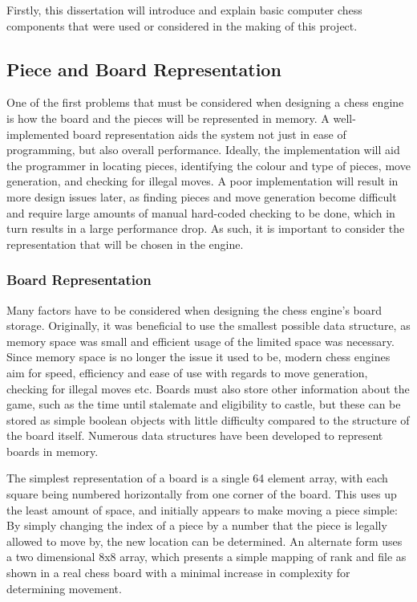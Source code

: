 \documentclass{l3proj}
\begin{document}
	Firstly, this dissertation will introduce and explain basic computer chess components that were used or considered in the making of this project. 

\subsection{Piece and Board Representation}

	One of the first problems that must be considered when designing a chess engine is how the board and the pieces will be represented in memory. A well-implemented board representation aids the system not just in ease of programming, but also overall performance. Ideally, the implementation will aid the programmer in locating pieces, identifying the colour and type of pieces, move generation, and checking for illegal moves. A poor implementation will result in more design issues later, as finding pieces and move generation become difficult and require large amounts of manual hard-coded checking to be done, which in turn results in a large performance drop. As such, it is important to consider the representation that will be chosen in the engine.

\subsubsection{Board Representation}

	Many factors have to be considered when designing the chess engine's board storage. Originally, it was beneficial to use the smallest possible data structure, as memory space was small and efficient usage of the limited space was necessary. Since memory space is no longer the issue it used to be, modern chess engines aim for speed, efficiency and ease of use with regards to move generation, checking for illegal moves etc. Boards must also store other information about the game, such as the time until stalemate and eligibility to castle, but these can be stored as simple boolean objects with little difficulty compared to the structure of the board itself. Numerous data structures have been developed to represent boards in memory.


	The simplest representation of a board is a single 64 element array, with each square being numbered horizontally from one corner of the board. This uses up the least amount of space, and initially appears to make moving a piece simple: By simply changing the index of a piece by a number that the piece is legally allowed to move by, the new location can be determined. An alternate form uses a two dimensional 8x8 array, which presents a simple mapping of rank and file as shown in a real chess board with a minimal increase in complexity for determining movement. 
\end{document}
